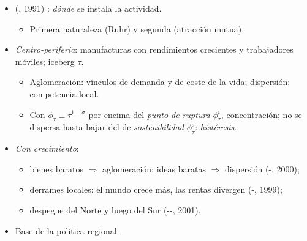 \documentclass{article}
\begin{document}
\begin{columnas}
\begin{itemize}
\item {} (, 1991) : \emph{dónde} se instala la actividad.
  \begin{itemize}
  \item Primera naturaleza (Ruhr) y segunda (atracción mutua).
  \end{itemize}
\item \emph{Centro-periferia}: manufacturas con rendimientos crecientes y trabajadores móviles; iceberg $\tau$.
  \begin{itemize}
  \item Aglomeración: vínculos de demanda y de coste de la vida; dispersión: competencia local.
  \item Con $\phi_\tau\equiv\tau^{1-\sigma}$ por encima del \emph{punto de ruptura} $\phi^{\mathrm r}_\tau$, concentración; no se dispersa hasta bajar del de \emph{sostenibilidad} $\phi^{\mathrm s}_\tau$: \emph{histéresis}.
  \end{itemize}
\end{itemize}
\begin{itemize}
\item \emph{Con crecimiento}:
  \begin{itemize}
  \item bienes baratos $\Rightarrow$ aglomeración; ideas baratas $\Rightarrow$ dispersión (-, 2000);
  \item derrames locales: el mundo crece más, las rentas divergen (-, 1999);
  \item despegue del Norte y luego del Sur (--, 2001).
  \end{itemize}
\item Base de la política regional .
\end{itemize}


\end{columnas}
\end{document}
